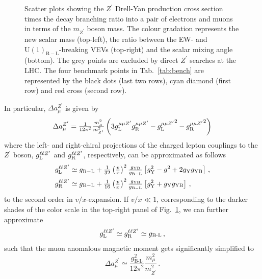 \documentclass[a4paper,11pt]{article}
\renewcommand{\(}{\left(}
\renewcommand{\)}{\right)}
\renewcommand{\[}{\left[}
\renewcommand{\]}{\right]}
\newcommand{\U}[1]{\mathrm{U}(1)_{\mathrm{#1}}}			%
\newcommand{\ro}[1]{\textrm{#1}}
\begin{document}
\begin{figure}[!htb]
	\caption{Scatter plots showing the $Z^\prime$ Drell-Yan production cross section times the decay branching ratio into a pair of electrons and muons in terms of the $m_{Z^\prime}$ boson mass. The colour gradation represents the new scalar mass (top-left), the ratio between the EW- and $\U{B-L}$-breaking VEVs (top-right) and the scalar mixing angle (bottom). The grey points are excluded by direct $Z^\prime$ searches at the LHC. The four benchmark points in Tab.~\ref{tab:bench} are represented by the black dots (last two rows), cyan diamond (first row) and red cross (second row).}
	\label{fig:Plots4}
\end{figure}	
In particular, $\Delta a_\mu^{Z^\prime}$ is given by \cite{Freitas:2014pua}
\begin{equation}
\Delta a_\mu^{Z^\prime} = \tfrac{1}{12 \pi^2} \tfrac{m_\mu^2}{m_{Z^\prime}^2} \(3 g_{\rm L}^{\mu \mu Z^\prime} g_{\rm R}^{\mu \mu Z^\prime} - {g_{\rm L}^{\mu \mu Z^\prime}}^2 - {g_{\rm R}^{\mu \mu Z^\prime}}^2 \)
\label{eq:ZpContribution}
\end{equation}
where the left- and right-chiral projections of the charged lepton couplings to the $Z^\prime$ boson, $g_{\rm L}^{\ell \ell Z^\prime}$ and $g_{\rm R}^{\ell \ell Z^\prime}$, respectively, can be approximated as follows
\begin{equation}
\begin{aligned}
    g_{\rm L}^{\ell \ell Z^\prime} &\simeq g_{\rm B-L} + \tfrac{1}{32} \(\tfrac{v}{x}\)^2 \tfrac{g_{\rm YB}}{g_{\rm B-L}} \[g_{\rm Y}^2 - g^2 + 2 g_{\rm Y}g_{\rm YB}\]\,,
    \\
    g_{\rm R}^{\ell \ell Z^\prime} &\simeq g_{\rm B-L} + \tfrac{1}{16} \(\tfrac{v}{x}\)^2 \tfrac{g_{\rm YB}}{g_{\rm B-L}} \[g_{\rm Y}^2 + g_{\rm Y}g_{\rm YB}\]\,,
\end{aligned}\label{eq:gllZ}
\end{equation}
to the second order in $v/x$-expansion. If $v/x \ll 1$, corresponding to the darker shades of the color scale in the top-right panel of Fig.~\ref{fig:Plots4}, we can further approximate
\begin{equation}
    g_{\rm L}^{\ell \ell Z^\prime} \simeq g_{\rm R}^{\ell \ell Z^\prime} \simeq g_\ro{B-L}\,,
    \label{eq:gLgR-simp}
\end{equation}
such that the muon anomalous magnetic moment gets significantly simplified to
\begin{equation}
\Delta a_\mu^{Z^\prime} \simeq \dfrac{g_\ro{B-L}^2}{12 \pi^2} \dfrac{m_\mu^2}{m_{Z^\prime}^2}\,.
\label{eq:amu-simple}
\end{equation}
\end{document}
